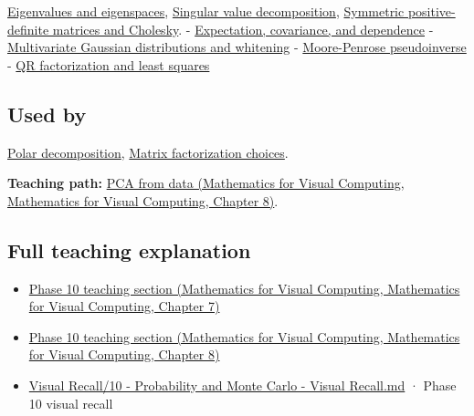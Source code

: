 \hyperref[appendix-0b3be18411f9]{Eigenvalues and eigenspaces}, \hyperref[appendix-1fad5e7f36fa]{Singular value decomposition}, \hyperref[appendix-50d2ea3c9b26]{Symmetric positive-definite matrices and Cholesky}. - \hyperref[appendix-54c383df9992]{Expectation, covariance, and dependence} - \hyperref[appendix-12bbe185dbe5]{Multivariate Gaussian distributions and whitening} - \hyperref[appendix-541306fdbc1b]{Moore-Penrose pseudoinverse} - \hyperref[appendix-c3421e6b4f2c]{QR factorization and least squares}

\subsection{Used by}\label{appendix-ad175ef3c5bf-used-by}

\hyperref[appendix-73f5bcf7a462]{Polar decomposition}, \hyperref[appendix-221a483bec2d]{Matrix factorization choices}.

\textbf{Teaching path:} \href{../02-Mathematics-for-Visual-Computing/main.pdf\#nameddest=02-foundations-ii-ch024-pca-turns-a-cloud-of-points-into-measured-variation}{PCA from data (Mathematics for Visual Computing, Mathematics for Visual Computing, Chapter 8)}.

\subsection{Full teaching explanation}\label{appendix-ad175ef3c5bf-full-teaching-explanation}

\begin{itemize}
\tightlist
\item
  \href{../02-Mathematics-for-Visual-Computing/main.pdf\#nameddest=02-foundations-ii-ch023-expected-values-describe-centers-covariance-describes-dependence}{Phase 10 teaching section (Mathematics for Visual Computing, Mathematics for Visual Computing, Chapter 7)}
\item
  \href{../02-Mathematics-for-Visual-Computing/main.pdf\#nameddest=02-foundations-ii-ch024-waiting-times-event-counts-and-covariance-geometry}{Phase 10 teaching section (Mathematics for Visual Computing, Mathematics for Visual Computing, Chapter 8)}
\item
  \hyperref[appendix-cb5af353ef77]{Visual Recall/10 - Probability and Monte Carlo - Visual Recall.md} · Phase 10 visual recall
\end{itemize}
